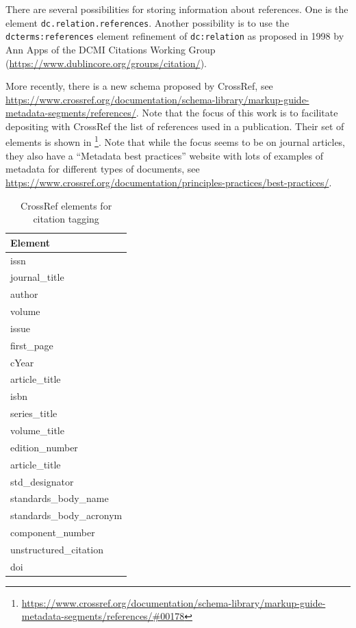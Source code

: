There are several possibilities for storing information about references. One is the element \texttt{dc.relation.references}. Another possibility is to use the \texttt{dcterms:references} element refinement of \texttt{dc:relation} as proposed in 1998 by Ann Apps of the DCMI Citations Working Group (\url{https://www.dublincore.org/groups/citation/}).

More recently, there is a new schema proposed by CrossRef, see \url{https://www.crossref.org/documentation/schema-library/markup-guide-metadata-segments/references/}. Note that the focus of this work is to facilitate depositing with CrossRef the list of references used in a publication. Their set of elements is shown in \footnote{\url{https://www.crossref.org/documentation/schema-library/markup-guide-metadata-segments/references/\#00178}}. Note that while the focus seems to be on journal articles, they also have a ``Metadata best practices'' website with lots of examples of metadata for different types of documents, see \url{https://www.crossref.org/documentation/principles-practices/best-practices/}.

\begin{table}[!ht]
    \caption{CrossRef elements for citation tagging}
    \label{tab:crossRefElementsForCitationTagging}
    \begin{tabular}{l}
      \textbf{Element}\\
      \hline
issn\\
journal\_title\\
author\\
volume\\
issue\\
first\_page\\
cYear\\
article\_title\\
isbn\\
series\_title\\
volume\_title\\
edition\_number\\
article\_title\\
std\_designator\\
standards\_body\_name\\
standards\_body\_acronym\\
component\_number\\
unstructured\_citation\\
doi\\
\end{tabular}
\end{table}

